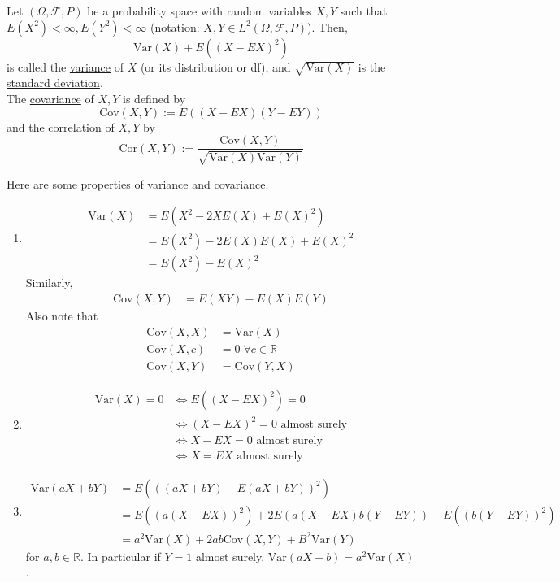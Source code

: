 \documentclass{article}
\newcommand{\R}{\mathbb{R}}
\newcommand{\Var}{\mathrm{Var}}
\newcommand{\Cov}{\mathrm{Cov}}
\newcommand{\Cor}{\text{Cor}}
\begin{document}
		\begin{mydef}{}{}
			Let $(\Omega, \mathcal{F}, P)$ be a probability space with random variables $X, Y$ such that $E(X^2)<\infty, E(Y^2)<\infty$ (notation: $X, Y\in L^2(\Omega, \mathcal{F}, P)$). Then, $$\Var(X)+E((X-EX)^2)$$ is called the \ul{variance} of $X$ (or its distribution or df), and $\sqrt{\Var(X)}$ is the \ul{standard deviation}.\\
			
			The \ul{covariance} of $X, Y$ is defined by $$\Cov(X, Y):=E((X-EX)(Y-EY))$$ and the \ul{correlation} of $X, Y$ by $$\Cor(X, Y):=\frac{\Cov(X, Y)}{\sqrt{\Var(X)\Var(Y)}}$$
		\end{mydef}
		
		\begin{myrem}{}{}
			Here are some properties of variance and covariance.
			\begin{enumerate}
				\item
				\begin{align*}
					\Var(X)&=E(X^2-2XE(X)+E(X)^2)\\
					&=E(X^2)-2E(X)E(X)+E(X)^2\\
					&=E(X^2)-E(X)^2
				\end{align*}
				Similarly,
				\begin{align*}
					\Cov(X, Y)&=E(XY)-E(X)E(Y)
				\end{align*}
				Also note that
				\begin{align*}
					\Cov(X, X)&=\Var(X)\\
					\Cov(X, c)&=0\;\forall c\in\R\\
					\Cov(X, Y)&=\Cov(Y, X)
				\end{align*}
				
				\item
				\begin{align*}
					\Var(X)=0&\Leftrightarrow E((X-EX)^2)=0\\
					&\Leftrightarrow(X-EX)^2=0\mbox{ almost surely}\\
					&\Leftrightarrow X-EX=0\mbox{ almost surely}\\
					&\Leftrightarrow X=EX\mbox{ almost surely}
				\end{align*}
				
				\item
				\begin{align*}
					\Var(aX+bY)&=E(((aX+bY)-E(aX+bY))^2)\\
					&=E((a(X-EX))^2)+2E(a(X-EX)b(Y-EY))+E((b(Y-EY))^2)\\
					&=a^2\Var(X)+2ab\Cov(X, Y)+B^2\Var(Y)
				\end{align*}
				for $a, b\in\R$. In particular if $Y=1$ almost surely, $\Var(aX+b)=a^2\Var(X)$.
				

\end{enumerate}
\end{myrem}
\end{document}

